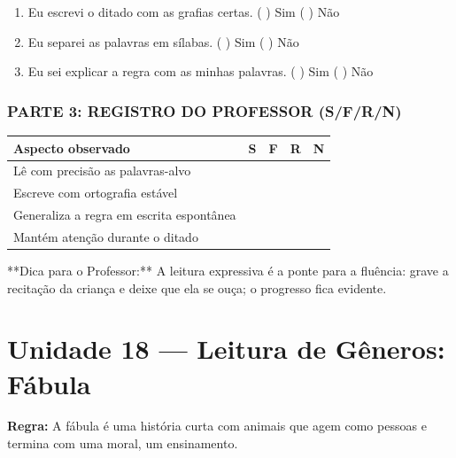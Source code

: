 \begin{exercicio}
\begin{enumerate}[label=\alph*)]
  \item Eu escrevi o ditado com as grafias certas.  \quad ( ) Sim   ( ) Não

  \item Eu separei as palavras em sílabas.  \quad ( ) Sim   ( ) Não

  \item Eu sei explicar a regra com as minhas palavras.  \quad ( ) Sim   ( ) Não

\end{enumerate}

\subsection*{PARTE 3: REGISTRO DO PROFESSOR (S/F/R/N)}

\begin{center}
\renewcommand{\arraystretch}{1.4}
\begin{tabular}{@{}p{9cm}cccc@{}}
\toprule
Aspecto observado & S & F & R & N \\
\midrule
Lê com precisão as palavras-alvo & & & & \\
Escreve com ortografia estável & & & & \\
Generaliza a regra em escrita espontânea & & & & \\
Mantém atenção durante o ditado & & & & \\
\bottomrule\end{tabular}\end{center}

\end{exercicio}

\begin{dica}
**Dica para o Professor:** A leitura expressiva é a ponte para a fluência: grave a recitação da criança e deixe que ela se ouça; o progresso fica evidente.
\end{dica}


\chapter{Unidade 18 --- Leitura de Gêneros: Fábula}


\textbf{Regra:} A fábula é uma história curta com animais que agem como pessoas e termina com uma moral, um ensinamento.

